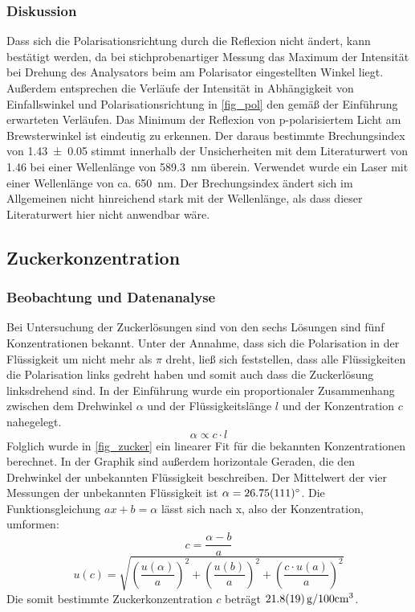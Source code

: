 \documentclass[
	a4paper,
	12pt,
	pagesize,
	ngerman
]{scrartcl}
\begin{document}
	\subsubsection{Diskussion}
	Dass sich die Polarisationsrichtung durch die Reflexion nicht ändert, kann bestätigt werden, da bei stichprobenartiger Messung das Maximum der Intensität bei Drehung des Analysators beim am Polarisator eingestellten Winkel liegt.
	Außerdem entsprechen die Verläufe der Intensität in Abhängigkeit von Einfallswinkel und Polarisationsrichtung in \cref{fig_pol} den gemäß der Einführung erwarteten Verläufen.
	Das Minimum der Reflexion von p-polarisiertem Licht am Brewsterwinkel ist eindeutig zu erkennen.
	Der daraus bestimmte Brechungsindex von \SI{1,43 \pm 0,05}{} stimmt innerhalb der Unsicherheiten mit dem Literaturwert von \SI{1,46}{} bei einer Wellenlänge von \SI{589,3}{nm} überein. \cite{quarz_brech}
	Verwendet wurde ein Laser mit einer Wellenlänge von ca. \SI{650}{\nano \meter}.
	Der Brechungsindex ändert sich im Allgemeinen nicht hinreichend stark mit der Wellenlänge, als dass dieser Literaturwert hier nicht anwendbar wäre.

	\subsection{Zuckerkonzentration}
	\subsubsection{Beobachtung und Datenanalyse}
	Bei Untersuchung der Zuckerlösungen sind von den sechs Lösungen sind fünf Konzentrationen bekannt.
	Unter der Annahme, dass sich die Polarisation in der Flüssigkeit um nicht mehr als $\pi$ dreht, ließ sich feststellen, dass alle Flüssigkeiten die Polarisation links gedreht haben und somit auch dass die Zuckerlösung linksdrehend sind.
	In der Einführung wurde ein proportionaler Zusammenhang zwischen dem Drehwinkel $\alpha$ und der Flüssigkeitslänge $l$ und der Konzentration $c$ nahegelegt.
	\begin{equation}
		\alpha \propto c \cdot l
	\end{equation}
	Folglich wurde in \cref{fig_zucker} ein linearer Fit für die bekannten Konzentrationen berechnet.
	In der Graphik sind außerdem horizontale Geraden, die den Drehwinkel der unbekannten Flüssigkeit beschreiben.
	Der Mittelwert der vier Messungen der unbekannten Flüssigkeit ist $\alpha=\SI{26,75+-1,11}{\degree}$.
	Die Funktionsgleichung $ax+b=\alpha$ lässt sich nach x, also der Konzentration, umformen:
	\begin{equation}
		c = \frac{\alpha-b}{a}
	\end{equation}
	\begin{equation}
		u(c) = \sqrt{ \left(\frac{u(\alpha)}{a}\right)^2 + \left(\frac{u(b)}{a}\right)^2 + \left(\frac{c \cdot u(a)}{a}\right)^2}
	\end{equation}
	Die somit bestimmte Zuckerkonzentration $c$ beträgt $\SI{21,8+-1,9}{g/100 cm^3}$.
\end{document}
